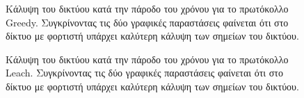 \begin{figure}[H]
  \centering
  \caption{Κάλυψη του δικτύου κατά την πάροδο του χρόνου για το πρωτόκολλο Greedy. Συγκρίνοντας τις δύο γραφικές παραστάσεις φαίνεται ότι στο δίκτυο με φορτιστή
υπάρχει καλύτερη κάλυψη των σημείων του δικτύου.}
  \label{fig:5_1exp_3_1}
\end{figure}

\begin{figure}[H]
  \centering
  \caption{Κάλυψη του δικτύου κατά την πάροδο του χρόνου για το πρωτόκολλο Leach. Συγκρίνοντας τις δύο γραφικές παραστάσεις φαίνεται ότι στο δίκτυο με φορτιστή
υπάρχει καλύτερη κάλυψη των σημείων του δικτύου.}
  \label{fig:5_1exp_3_2}
\end{figure}

